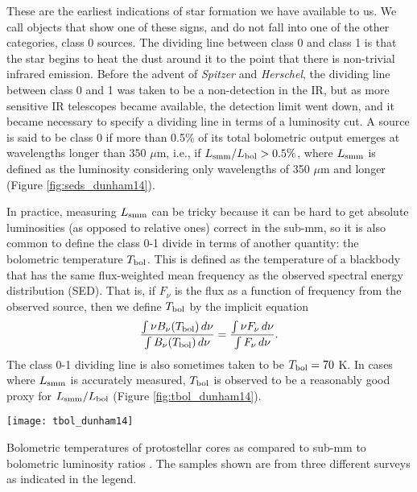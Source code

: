 These are the earliest indications of star formation we have available to us. We call objects that show one of these signs, and do not fall into one of the other categories, class 0 sources. The dividing line between class 0 and class 1 is that the star begins to heat the dust around it to the point that there is non-trivial infrared emission. Before the advent of \textit{Spitzer} and \textit{Herschel}, the dividing line between class 0 and 1 was taken to be a non-detection in the IR, but as more sensitive IR telescopes became available, the detection limit went down, and it became necessary to specify a dividing line in terms of a luminosity cut. A source is said to be class 0 if more than 0.5\% of its total bolometric output emerges at wavelengths longer than $350$ $\mu$m, i.e., if $L_{\rm smm} / L_{\rm bol} > 0.5\%$, where $L_{\rm smm}$ is defined as the luminosity considering only wavelengths of 350 $\mu$m and longer (Figure \ref{fig:seds_dunham14}).

In practice, measuring $L_{\rm smm}$ can be tricky because it can be hard to get absolute luminosities (as opposed to relative ones) correct in the sub-mm, so it is also common to define the class 0-1 divide in terms of another quantity: the bolometric temperature $T_{\rm bol}$. This is defined as the temperature of a blackbody that has the same flux-weighted mean frequency as the observed spectral energy distribution (SED). That is, if $F_\nu$ is the flux as a function of frequency from the observed source, then we define $T_{\rm bol}$ by the implicit equation
\begin{equation}
\frac{\int \nu B_{\nu}(T_{\rm bol}) \, d\nu}{\int B_{\nu}(T_{\rm bol}) \, d\nu} = \frac{\int \nu F_{\nu}\, d\nu}{\int F_\nu \,d\nu}.
\end{equation}
The class 0-1 dividing line is also sometimes taken to be $T_{\rm bol} = 70$ K. In cases where $L_{\rm smm}$ is accurately measured, $T_{\rm bol}$ is observed to be a reasonably good proxy for $L_{\rm smm} / L_{\rm bol}$ (Figure \ref{fig:tbol_dunham14}).

\begin{marginfigure}
\texttt{[image: tbol\_dunham14]}
\caption[Bolometric temperatures of protostellar cores]{
\label{fig:tbol_dunham14}
Bolometric temperatures of protostellar cores as compared to sub-mm to bolometric luminosity ratios \citep{dunham14a}. The samples shown are from three different surveys as indicated in the legend.
}
\end{marginfigure}

